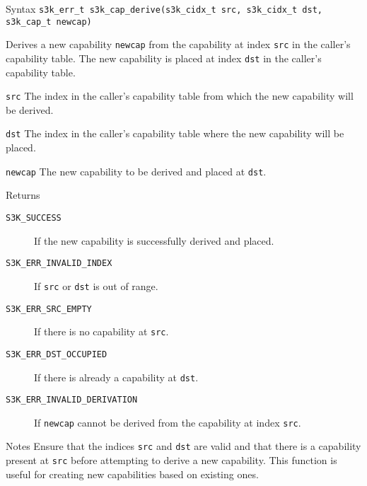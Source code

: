 \documentclass[a4paper,11pt]{article}
\newcommand{\syscall}[1]{\texttt{#1}}
\newenvironment{syscalldoc}[1]{
  \begin{tcolorbox}[breakable,title=\subsection{\syscall{#1}}]
  \begin{description}[leftmargin=!,style=nextline,noitemsep]
}{
  \end{description}
  \end{tcolorbox}
}
\begin{document}
\begin{syscalldoc}{s3k\_cap\_derive}
  \item[Syntax] \lstinline{s3k_err_t s3k_cap_derive(s3k_cidx_t src, s3k_cidx_t dst, s3k_cap_t newcap)}
  \item[Description]
	  Derives a new capability \verb|newcap| from the capability at index \verb|src| in the caller's capability table. The new capability is placed at index \verb|dst| in the caller's capability table.

  \item[Parameters]
    \begin{description}
      \item[]
      \item[\texttt{src}] The index in the caller's capability table from which the new capability will be derived.
      \item[\texttt{dst}] The index in the caller's capability table where the new capability will be placed.
      \item[\texttt{newcap}] The new capability to be derived and placed at \verb|dst|.
    \end{description}

  \item[Returns]
    \begin{description}
      \item[]
      \item[\texttt{S3K\_SUCCESS}] If the new capability is successfully derived and placed.
      \item[\texttt{S3K\_ERR\_INVALID\_INDEX}] If \verb|src| or \verb|dst| is out of range.
      \item[\texttt{S3K\_ERR\_SRC\_EMPTY}] If there is no capability at \verb|src|.
      \item[\texttt{S3K\_ERR\_DST\_OCCUPIED}] If there is already a capability at \verb|dst|.
      \item[\texttt{S3K\_ERR\_INVALID\_DERIVATION}] If \verb|newcap| cannot be derived from the capability at index \verb|src|.
    \end{description}

  \item[Notes]
	  Ensure that the indices \verb|src| and \verb|dst| are valid and that there is a capability present at \verb|src| before attempting to derive a new capability. This function is useful for creating new capabilities based on existing ones.
\end{syscalldoc}
\end{document}
